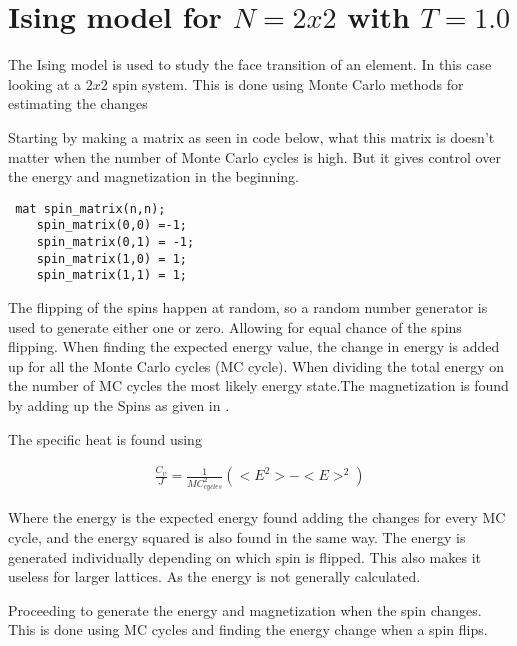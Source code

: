 \section{Ising model for $N = 2x2$  with $T = 1.0$}

The Ising model is used to study the face transition of an element. In this case looking at a $2x2$ spin system. This is done using Monte Carlo methods for estimating the changes 

Starting by making a matrix as seen in code below, what this matrix is doesn't matter when the number of Monte Carlo cycles is high. But it gives control over the energy and magnetization in the beginning. 

\begin{lstlisting}
 mat spin_matrix(n,n);
    spin_matrix(0,0) =-1;
    spin_matrix(0,1) = -1;
    spin_matrix(1,0) = 1;
    spin_matrix(1,1) = 1;

\end{lstlisting}

The flipping of the spins happen at random, so a random number generator is used to generate either one or zero. Allowing for equal chance of the spins flipping. When finding the expected energy value, the change in energy is added up for all the Monte Carlo cycles (MC cycle). When dividing the total energy on the number of MC cycles the most likely energy state.The magnetization is found by adding up the Spins as given in . 

The specific heat is found using 

\begin{align}
\frac{C_v}{J} = \frac{1}{MC_{cycles}^2} (<E^2> - <E>^2)
\end{align}

Where the energy is the expected energy found adding the changes for every MC cycle, and the energy squared is also found in the same way. The energy is generated individually depending on which spin is flipped. This also makes it useless for larger lattices. As the energy is not generally calculated.   


Proceeding to generate the energy and magnetization when the spin changes. This is done using MC cycles and finding the energy change when a spin flips. 

